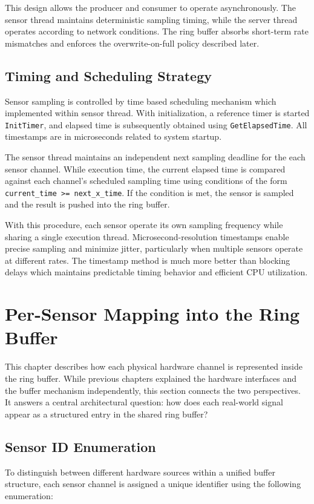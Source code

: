 This design allows the producer and consumer to operate asynchronously. The sensor thread maintains deterministic sampling timing, while the server thread operates according to network conditions. The ring buffer absorbs short-term rate mismatches and enforces the overwrite-on-full policy described later. 

\subsection{Timing and Scheduling Strategy}
Sensor sampling is controlled by time based scheduling mechanism which implemented within sensor thread. With initialization, a reference timer is started \texttt{InitTimer}, and elapsed time is subsequently obtained using \texttt{GetElapsedTime}. All timestamps are in microseconds related to system startup. 

The sensor thread maintains an independent next sampling deadline for the each sensor channel. While execution time, the current elapsed time is compared against each channel’s scheduled sampling time using conditions of the form \texttt{current\_time >= next\_x\_time}. If the condition is met, the sensor is sampled and the result is pushed into the ring buffer.

With this procedure, each sensor operate its own sampling frequency while sharing a single execution thread. Microsecond-resolution timestamps enable precise sampling and minimize jitter, particularly when multiple sensors operate at different rates. The timestamp method is much more better than blocking delays which maintains predictable timing behavior and efficient CPU utilization.


\section{Per-Sensor Mapping into the Ring Buffer}
This chapter describes how each physical hardware channel is represented inside the ring buffer. While previous chapters explained the hardware interfaces and the buffer mechanism independently, this section connects the two perspectives. It answers a central architectural question: how does each real-world signal appear as a structured entry in the shared ring buffer?

\subsection{	Sensor ID Enumeration}
To distinguish between different hardware sources within a unified buffer structure, each sensor channel is assigned a unique identifier using the following enumeration:

